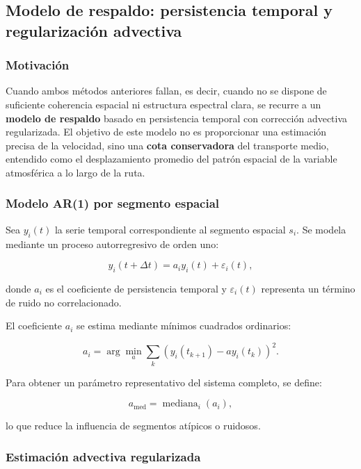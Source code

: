 \documentclass[
  spanish,
  us-letterpaper,
]{scrreprt}
\numberwithin{equation}{section}
\begin{document}
\subsection{Modelo de respaldo: persistencia temporal y regularización
advectiva}\label{modelo-de-respaldo-persistencia-temporal-y-regularizaciuxf3n-advectiva}

\subsubsection{Motivación}\label{motivaciuxf3n}

Cuando ambos métodos anteriores fallan, es decir, cuando no se dispone
de suficiente coherencia espacial ni estructura espectral clara, se
recurre a un \textbf{modelo de respaldo} basado en persistencia temporal
con corrección advectiva regularizada. El objetivo de este modelo no es
proporcionar una estimación precisa de la velocidad, sino una
\textbf{cota conservadora} del transporte medio, entendido como el
desplazamiento promedio del patrón espacial de la variable atmosférica a
lo largo de la ruta.

\subsubsection{Modelo AR(1) por segmento
espacial}\label{modelo-ar1-por-segmento-espacial}

Sea \(y_i(t)\) la serie temporal correspondiente al segmento espacial
\(s_i\). Se modela mediante un proceso autorregresivo de orden uno:

\[
y_i(t+\Delta t) = a_i y_i(t) + \varepsilon_i(t),
\]

donde \(a_i\) es el coeficiente de persistencia temporal y
\(\varepsilon_i(t)\) representa un término de ruido no correlacionado.

El coeficiente \(a_i\) se estima mediante mínimos cuadrados ordinarios:

\[
a_i = \arg\min_a \sum_{k} \left(y_i(t_{k+1}) - a y_i(t_k)\right)^2.
\]

Para obtener un parámetro representativo del sistema completo, se
define:

\[
a_{\text{med}} = \operatorname{mediana}_i \left( a_i \right),
\]

lo que reduce la influencia de segmentos atípicos o ruidosos.

\subsubsection{Estimación advectiva
regularizada}\label{estimaciuxf3n-advectiva-regularizada}
\end{document}
